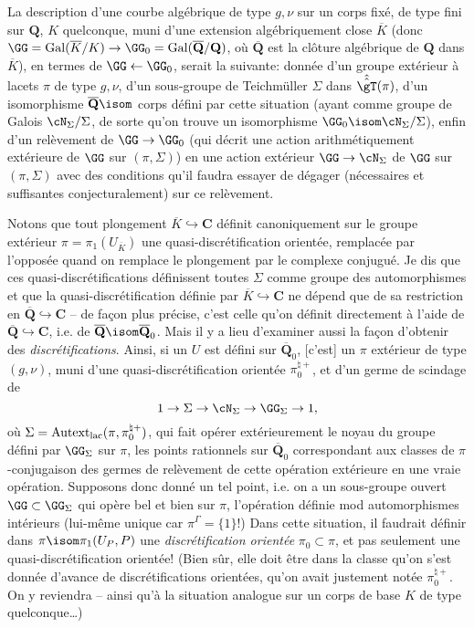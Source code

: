 La description d'une courbe algébrique de type $g,\nu$
sur un corps fixé, de type fini sur $\mathbf{Q}$, $K$ quelconque,
muni d'une extension algébriquement close $\overline K$
(donc $\GG={\rm Gal}(\overline K/K)\to
\GG_0={\rm Gal}(\overline{\mathbf{Q}}/\mathbf{Q})$, où $\overline{\mathbf{Q}}$
est la clôture algébrique de $\mathbf{Q}$ dans $\overline K$),
en termes de $\GG\leftarrow\GG_0$, serait la suivante:
donnée d'un groupe extérieur à lacets $\pi$
de type $g,\nu$, d'un sous-groupe de Teichmüller
$\Sigma$ dans $\hat{\hat\gT}(\pi)$, d'un isomorphisme
$\overline{\mathbf{Q}} \isom $ corps défini par cette situation
(ayant comme groupe de Galois $\cN_\Sigma/\Sigma$, de
sorte qu'on trouve un isomorphisme $\GG_0 \isom 
\cN_\Sigma/\Sigma$), enfin d'un relèvement de
$\GG\to\GG_0$ (qui décrit une action
arithmétiquement extérieure de $\GG$ sur $(\pi,\Sigma)$)
en une action extérieur $\GG\to\cN_\Sigma$
de $\GG$ sur $(\pi,\Sigma)$ avec des conditions qu'il
faudra essayer de dégager (nécessaires et
suffisantes conjecturalement) sur ce relèvement.

Notons que tout plongement $\overline K\hookrightarrow
\mathbf{C}$ définit canoniquement sur le groupe extérieur $\pi=
\pi_1(U_{\overline K})$ une quasi-discrétification
orientée, remplacée par l'opposée quand on remplace
le plongement par le complexe conjugué.  Je dis que
ces quasi-discrétifications définissent toutes
$\Sigma$ comme groupe des automorphismes et que la 
quasi-discrétification définie par $\overline K
\hookrightarrow \mathbf{C}$ ne dépend que de sa restriction en
$\overline{\mathbf{Q}}\hookrightarrow \mathbf{C}$ -- de fa\c con plus
précise, c'est celle qu'on définit directement à l'aide
de $\overline{\mathbf{Q}}\hookrightarrow \mathbf{C}$, i.e. de
$\overline{\mathbf{Q}} \isom \overline{\mathbf{Q}}_0$.  Mais il y a lieu
d'examiner aussi la fa\c con d'obtenir des {\it discrétifications}.
Ainsi, si un $U$ est défini sur $\overline{\mathbf{Q}}_0$, [c'est]  un $\pi$
extérieur de type $(g,\nu)$, muni d'une quasi-discrétification
orientée $\pi_0^{\natural +}$, et d'un germe de scindage de
$$1\to\Sigma\to\cN_\Sigma\to\GG_\Sigma
\to 1,$$
où $\Sigma={\rm Autext}_{\rm lac}(\pi,\pi_0^{\natural+})$, qui
fait opérer extérieurement le noyau du groupe défini par $\GG_\Sigma$
sur $\pi$, les points rationnels sur $\overline{\mathbf{Q}}_0$
correspondant aux classes de $\pi$-conjugaison des germes
de relèvement de cette opération extérieure en une
vraie opération.  Supposons donc donné un tel point,
i.e. on a un sous-groupe ouvert $\GG\subset \GG_\Sigma$
qui opère bel et bien sur $\pi$, l'opération définie
mod automorphismes intérieurs (lui-même unique car $\pi^\Gamma
=\{1\}$!)  Dans cette situation, il faudrait définir
dans $\pi \isom \pi_1(U_P,P)$ une {\it discrétification
orientée} $\pi_0\subset \pi$, et pas seulement une
quasi-discrétification orientée!  (Bien s\^ur, elle
doit être dans la classe qu'on s'est donnée d'avance
de discrétifications orientées, qu'on avait justement
notée $\pi_0^{\natural+}$.  On y reviendra -- ainsi qu'à 
la situation analogue sur un corps de base $K$ de type
quelconque\dots)

